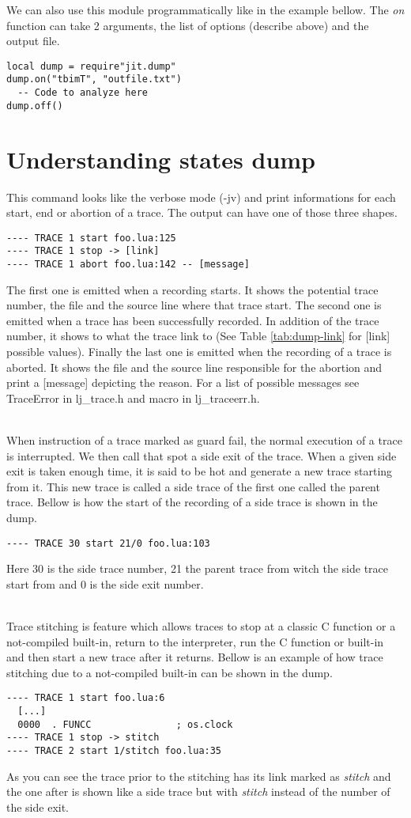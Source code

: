 We can also use this module programmatically like in the example bellow. The
\emph{on} function can take 2 arguments, the list of options (describe above)
and the output file.
\begin{lstlisting}[style=LuaStyle]
local dump = require"jit.dump"
dump.on("tbimT", "outfile.txt")
  -- Code to analyze here
dump.off()
\end{lstlisting}

\section{Understanding states dump}
\label{Sec:dump-states}
This command looks like the verbose mode (-jv) and print informations for each start,
end or abortion of a trace. The output can have one of those three shapes.
\begin{verbatim}
---- TRACE 1 start foo.lua:125
---- TRACE 1 stop -> [link]
---- TRACE 1 abort foo.lua:142 -- [message]
\end{verbatim}
The first one is emitted when a recording starts. It shows the potential
trace number, the file and the source line where that trace start.
The second one is emitted when a trace has been successfully recorded. In
addition of the trace number, it shows to what the trace link to (See Table
\ref{tab:dump-link} for [link] possible values). Finally the last one is emitted
when the recording of a trace is aborted. It shows the file and the source line
responsible for the abortion and print a [message] depicting the reason. For
a list of possible messages see TraceError in lj\_trace.h and macro in
lj\_traceerr.h.

\\
When instruction of a trace marked as guard fail, the normal execution of a
trace is interrupted. We then call that spot a side exit of the trace. When a
given side exit is taken enough time, it is said to be hot and generate a new
trace starting from it. This new trace is called a side trace of the first one
called the parent trace. Bellow is how the start of the recording of a side
trace is shown in the dump.
\begin{verbatim}
---- TRACE 30 start 21/0 foo.lua:103
\end{verbatim}
Here 30 is the side trace number, 21 the parent trace from witch the side trace
start from and 0 is the side exit number.

\\
Trace stitching is feature which allows traces to stop at a classic C function
or a not-compiled built-in, return to the interpreter, run the C function or
built-in and then start a new trace after it returns. Bellow is an example of
how trace stitching due to a not-compiled built-in can be shown in the dump.
\begin{verbatim}
---- TRACE 1 start foo.lua:6
  [...]
  0000  . FUNCC               ; os.clock
---- TRACE 1 stop -> stitch
---- TRACE 2 start 1/stitch foo.lua:35
\end{verbatim}
As you can see the trace prior to the stitching has its link marked as
\emph{stitch} and the one after is shown like a side trace but with
\emph{stitch} instead of the number of the side exit.

